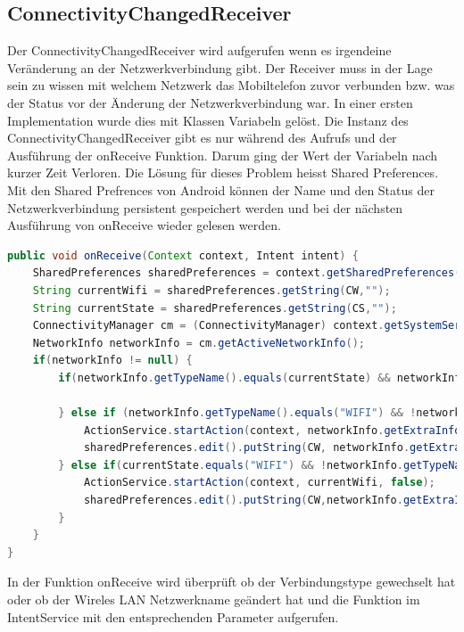 \subsection{ConnectivityChangedReceiver}
Der ConnectivityChangedReceiver wird aufgerufen wenn es irgendeine Veränderung an der Netzwerkverbindung gibt. Der Receiver muss in der Lage sein zu wissen mit welchem Netzwerk das Mobiltelefon zuvor verbunden bzw. was der Status vor der Änderung der Netzwerkverbindung war. In einer ersten Implementation wurde dies mit Klassen Variabeln gelöst. Die Instanz des ConnectivityChangedReceiver gibt es nur während des Aufrufs und der Ausführung der onReceive Funktion. Darum ging der Wert der Variabeln nach kurzer Zeit Verloren. Die Lösung für dieses Problem heisst Shared Preferences. Mit den Shared Prefrences von Android können der Name und den Status der Netzwerkverbindung persistent gespeichert werden und bei der nächsten Ausführung von onReceive wieder gelesen werden.
\begin{lstlisting}[language=Java]
public void onReceive(Context context, Intent intent) {
    SharedPreferences sharedPreferences = context.getSharedPreferences("com.koki.app.wifiaction",Context.MODE_PRIVATE);
    String currentWifi = sharedPreferences.getString(CW,"");
    String currentState = sharedPreferences.getString(CS,"");
    ConnectivityManager cm = (ConnectivityManager) context.getSystemService(Context.CONNECTIVITY_SERVICE);
    NetworkInfo networkInfo = cm.getActiveNetworkInfo();
    if(networkInfo != null) {
        if(networkInfo.getTypeName().equals(currentState) && networkInfo.getExtraInfo().equals(currentWifi) ) {

        } else if (networkInfo.getTypeName().equals("WIFI") && !networkInfo.getExtraInfo().equals(currentWifi)) {
            ActionService.startAction(context, networkInfo.getExtraInfo(), true);
            sharedPreferences.edit().putString(CW, networkInfo.getExtraInfo()).putString(CS,networkInfo.getTypeName()).commit();
        } else if(currentState.equals("WIFI") && !networkInfo.getTypeName().equals("WIFI")) {
            ActionService.startAction(context, currentWifi, false);
            sharedPreferences.edit().putString(CW,networkInfo.getExtraInfo()).putString(CS,networkInfo.getTypeName()).commit();
        }
    }
}
\end{lstlisting}
In der Funktion onReceive wird überprüft ob der Verbindungstype gewechselt hat oder ob der Wireles LAN Netzwerkname geändert hat und die Funktion im IntentService mit den entsprechenden Parameter aufgerufen.

